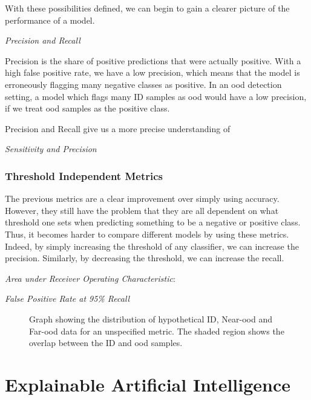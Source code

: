 \documentclass[UKenglish]{uiomasterthesis} %
\theoremstyle{definition}
\begin{document}
With these possibilities defined, we can begin to gain a clearer picture of the performance of a model.

{\it Precision and Recall}

Precision is the share of positive predictions that were actually positive. With a high false positive rate, we have a low precision, which means that the model is erroneously flagging many negative classes as positive. In an \ac{ood} detection setting, a model which flags many ID samples as \ac{ood} would have a low precision, if we treat \ac{ood} samples as the positive class.

Precision and Recall give us a more precise understanding of 

{\it Sensitivity and Precision}

\subsubsection{Threshold Independent Metrics}

The previous metrics are a clear improvement over simply using accuracy. However, they still have the problem that they are all dependent on what threshold one sets when predicting something to be a negative or positive class. Thus, it becomes harder to compare different models by using these metrics. Indeed, by simply increasing the threshold of any classifier, we can increase the precision. Similarly, by decreasing the threshold, we can increase the recall.

{\it Area under Receiver Operating Characteristic}:

{\it False Positive Rate at 95\% Recall}





\begin{figure}
    \label{fig:auroc}
    \begin{center}
        
    \end{center}
    \caption[Hypothetical ID/\ac{ood} distributions for an \ac{ood} detection metric]{Graph showing the distribution of hypothetical ID, Near-\ac{ood} and Far-\ac{ood} data for an unspecified metric. The shaded region shows the overlap between the ID and \ac{ood} samples.}
\end{figure}

\section{Explainable Artificial Intelligence} \label{chapter:xai}
\end{document}

